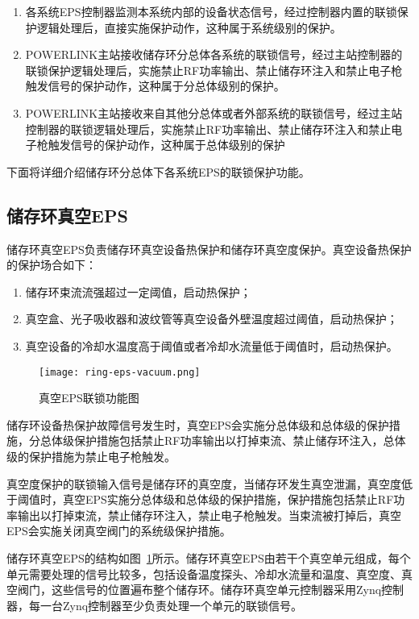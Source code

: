 \begin{enumerate}
  \item 各系统EPS控制器监测本系统内部的设备状态信号，经过控制器内置的联锁保护逻辑处理后，直接实施保护动作，这种属于系统级别的保护。
  \item POWERLINK主站接收储存环分总体各系统的联锁信号，经过主站控制器的联锁保护逻辑处理后，实施禁止RF功率输出、禁止储存环注入和禁止电子枪触发信号的保护动作，这种属于分总体级别的保护。
  \item POWERLINK主站接收来自其他分总体或者外部系统的联锁信号，经过主站控制器的联锁逻辑处理后，实施禁止RF功率输出、禁止储存环注入和禁止电子枪触发信号的保护动作，这种属于总体级别的保护
\end{enumerate}

下面将详细介绍储存环分总体下各系统EPS的联锁保护功能。

\subsection{储存环真空EPS}

储存环真空EPS负责储存环真空设备热保护和储存环真空度保护。真空设备热保护的保护场合如下：

\begin{enumerate}
  \item 储存环束流流强超过一定阈值，启动热保护；

  \item 真空盒、光子吸收器和波纹管等真空设备外壁温度超过阈值，启动热保护；

  \item 真空设备的冷却水温度高于阈值或者冷却水流量低于阈值时，启动热保护。
\end{enumerate}

\begin{figure}[!htb]
	\centering
	\texttt{[image: ring-eps-vacuum.png]}
	\caption{真空EPS联锁功能图}
	\label{fig:ring-eps-vacuum}
\end{figure}

储存环设备热保护故障信号发生时，真空EPS会实施分总体级和总体级的保护措施，分总体级保护措施包括禁止RF功率输出以打掉束流、禁止储存环注入，总体级的保护措施为禁止电子枪触发。

真空度保护的联锁输入信号是储存环的真空度，当储存环发生真空泄漏，真空度低于阈值时，真空EPS实施分总体级和总体级的保护措施，保护措施包括禁止RF功率输出以打掉束流，禁止储存环注入，禁止电子枪触发。当束流被打掉后，真空EPS会实施关闭真空阀门的系统级保护措施。

储存环真空EPS的结构如图~\ref{fig:ring-eps-vacuum}所示。储存环真空EPS由若干个真空单元组成，每个单元需要处理的信号比较多，包括设备温度探头、冷却水流量和温度、真空度、真空阀门，这些信号的位置遍布整个储存环。储存环真空单元控制器采用Zynq控制器，每一台Zynq控制器至少负责处理一个单元的联锁信号。

